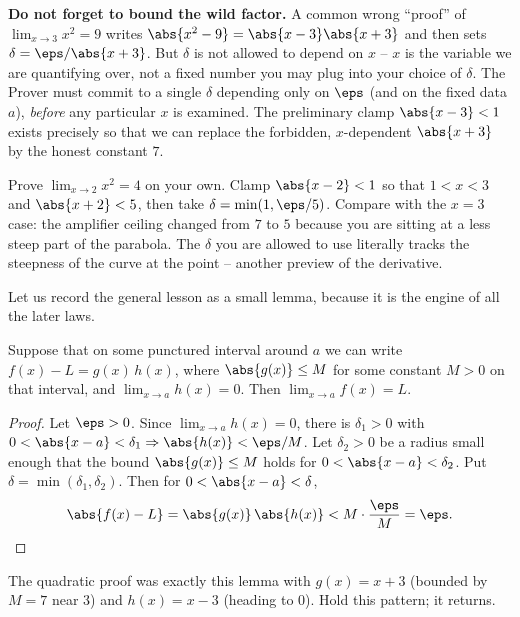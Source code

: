 \begin{trapbox}
\textbf{Do not forget to bound the wild factor.} A common wrong ``proof'' of
$\lim_{x\to3}x^2=9$ writes $\abs{x^2-9}=\abs{x-3}\abs{x+3}$ and then sets
$\delta=\eps/\abs{x+3}$. But $\delta$ is not allowed to depend on $x$ -- $x$ is
the variable we are quantifying over, not a fixed number you may plug into your
choice of $\delta$. The Prover must commit to a single $\delta$ depending only on
$\eps$ (and on the fixed data $a$), \emph{before} any particular $x$ is examined.
The preliminary clamp $\abs{x-3}<1$ exists precisely so that we can replace the
forbidden, $x$-dependent $\abs{x+3}$ by the honest constant $7$.
\end{trapbox}

\begin{labbox}
Prove $\displaystyle\lim_{x\to 2}x^2 = 4$ on your own. Clamp $\abs{x-2}<1$ so
that $1<x<3$ and $\abs{x+2}<5$, then take $\delta=\min(1,\eps/5)$. Compare with
the $x=3$ case: the amplifier ceiling changed from $7$ to $5$ because you are
sitting at a less steep part of the parabola. The $\delta$ you are allowed to use
literally tracks the steepness of the curve at the point -- another preview of
the derivative.
\end{labbox}

Let us record the general lesson as a small lemma, because it is the engine
of all the later laws.

\begin{lemma}
\label{ch06:lem-stb}
Suppose that on some punctured interval around $a$ we can write $f(x)-L =
g(x)\,h(x)$, where $\abs{g(x)} \le M$ for some constant $M>0$ on that interval,
and $\lim_{x\to a} h(x) = 0$. Then $\lim_{x\to a} f(x) = L$.
\end{lemma}

\begin{proof}
Let $\eps>0$. Since $\lim_{x\to a}h(x)=0$, there is $\delta_1>0$ with
$0<\abs{x-a}<\delta_1 \Rightarrow \abs{h(x)} < \eps/M$. Let $\delta_2>0$ be a
radius small enough that the bound $\abs{g(x)}\le M$ holds for
$0<\abs{x-a}<\delta_2$. Put $\delta=\min(\delta_1,\delta_2)$. Then for
$0<\abs{x-a}<\delta$,
\[
  \abs{f(x)-L} = \abs{g(x)}\,\abs{h(x)} < M\cdot\frac{\eps}{M} = \eps. \qedhere
\]
\end{proof}

The quadratic proof was exactly this lemma with $g(x)=x+3$ (bounded by $M=7$ near
$3$) and $h(x)=x-3$ (heading to $0$). Hold this pattern; it returns.

